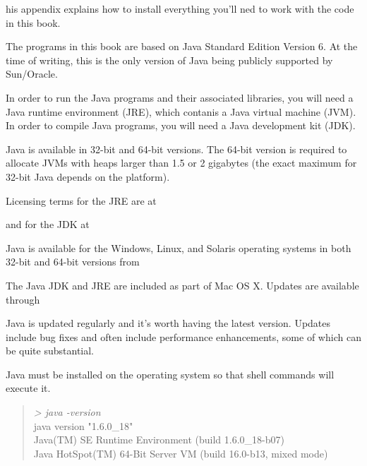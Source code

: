 
his appendix explains how to install everything you'll
ned to work with the code in this book.



\noindent
The programs in this book are based on Java Standard Edition Version
6.  At the time of writing, this is the only version of Java being
publicly supported by Sun/Oracle.

In order to run the Java programs and their
associated libraries, you will need a Java runtime environment (JRE),
which contanis a Java virtual machine (JVM).  In order to compile Java
programs, you will need a Java development kit (JDK).

Java is available in 32-bit and 64-bit versions.  The 64-bit version
is required to allocate JVMs with heaps larger than 1.5 or 2 gigabytes
(the exact maximum for 32-bit Java depends on the platform).  

Licensing terms for the JRE are at
%
\begin{quote}
\end{quote}
and for the JDK at
%
\begin{quote}
\end{quote}

Java is available for the Windows, Linux, and Solaris operating
systems in both 32-bit and 64-bit versions from
%
\begin{quote}
\end{quote}
%
The Java JDK and JRE are included as part of Mac OS X.  Updates are
available through
%
\begin{quote}
\end{quote}
%
Java is updated regularly and it's worth having the latest version.
Updates include bug fixes and often include performance enhancements,
some of which can be quite substantial.

Java must be installed on the operating system so that shell commands
will execute it.  

\begin{quote}
{\small
\ttfamily
{\it\ttfamily > java -version}
\\
java version "1.6.0\_18"
\\
Java(TM) SE Runtime Environment (build 1.6.0\_18-b07)
\\
Java HotSpot(TM) 64-Bit Server VM (build 16.0-b13, mixed mode)
}
\end{quote}

